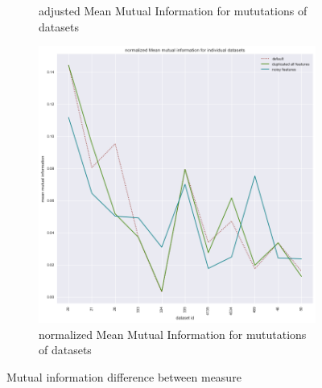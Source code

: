 \documentclass[a4paper,10pt]{article}
\begin{document}
\begin{figure}[H]
\begin{subfigure}[b]{0.45\textwidth}
		\caption{adjusted Mean Mutual Information for mututations of datasets}
		\label{fig:AMMI}
	\end{subfigure}
	\begin{subfigure}[b]{0.45\textwidth}
		\includegraphics[width=\textwidth]{images/normalizedMeanMutualInformation.png}
		\caption{normalized Mean Mutual Information for mututations of datasets}
		\label{fig:NMMI}
	\end{subfigure}
	\caption{Mutual information difference between measure}\label{fig:MMIs}
\end{figure}
\end{document}
